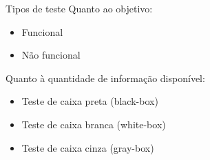 
\begin{frame}{Tipos de teste}
    Quanto ao objetivo:
    \begin{itemize}
        \item Funcional
        \item Não funcional
    \end{itemize}
    \vspace{1.0cm}
    Quanto à quantidade de informação disponível:
    \begin{itemize}
        \item Teste de caixa preta (black-box)
        \item Teste de caixa branca (white-box)
        \item Teste de caixa cinza (gray-box)
    \end{itemize}

\end{frame}
